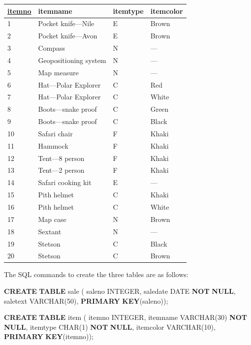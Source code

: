 \documentclass[
]{article}
\newenvironment{Shaded}{\begin{snugshade}}{\end{snugshade}}
\newcommand{\DataTypeTok}[1]{\textcolor[rgb]{0.13,0.29,0.53}{#1}}
\newcommand{\DecValTok}[1]{\textcolor[rgb]{0.00,0.00,0.81}{#1}}
\newcommand{\KeywordTok}[1]{\textcolor[rgb]{0.13,0.29,0.53}{\textbf{#1}}}
\newcommand{\NormalTok}[1]{#1}
\begin{document}
\begin{longtable}[]{@{}llll@{}}
\toprule
\underline{itemno} & itemname & itemtype & itemcolor \\
\midrule
\endhead
1 & Pocket knife---Nile & E & Brown \\
2 & Pocket knife---Avon & E & Brown \\
3 & Compass & N & --- \\
4 & Geopositioning system & N & --- \\
5 & Map measure & N & --- \\
6 & Hat---Polar Explorer & C & Red \\
7 & Hat---Polar Explorer & C & White \\
8 & Boots---snake proof & C & Green \\
9 & Boots---snake proof & C & Black \\
10 & Safari chair & F & Khaki \\
11 & Hammock & F & Khaki \\
12 & Tent---8 person & F & Khaki \\
13 & Tent---2 person & F & Khaki \\
14 & Safari cooking kit & E & --- \\
15 & Pith helmet & C & Khaki \\
16 & Pith helmet & C & White \\
17 & Map case & N & Brown \\
18 & Sextant & N & --- \\
19 & Stetson & C & Black \\
20 & Stetson & C & Brown \\
\bottomrule
\end{longtable}

The SQL commands to create the three tables are as follows:

\begin{Shaded}
\begin{Highlighting}[]
\KeywordTok{CREATE} \KeywordTok{TABLE}\NormalTok{ sale (}
\NormalTok{    saleno      }\DataTypeTok{INTEGER}\NormalTok{,}
\NormalTok{    saledate        }\DataTypeTok{DATE} \KeywordTok{NOT} \KeywordTok{NULL}\NormalTok{,}
\NormalTok{    saletext        }\DataTypeTok{VARCHAR}\NormalTok{(}\DecValTok{50}\NormalTok{),}
      \KeywordTok{PRIMARY} \KeywordTok{KEY}\NormalTok{(saleno));}
\end{Highlighting}
\end{Shaded}

\begin{Shaded}
\begin{Highlighting}[]
\KeywordTok{CREATE} \KeywordTok{TABLE}\NormalTok{ item (}
\NormalTok{    itemno      }\DataTypeTok{INTEGER}\NormalTok{,}
\NormalTok{    itemname        }\DataTypeTok{VARCHAR}\NormalTok{(}\DecValTok{30}\NormalTok{) }\KeywordTok{NOT} \KeywordTok{NULL}\NormalTok{,}
\NormalTok{    itemtype        }\DataTypeTok{CHAR}\NormalTok{(}\DecValTok{1}\NormalTok{) }\KeywordTok{NOT} \KeywordTok{NULL}\NormalTok{,}
\NormalTok{    itemcolor       }\DataTypeTok{VARCHAR}\NormalTok{(}\DecValTok{10}\NormalTok{),}
        \KeywordTok{PRIMARY} \KeywordTok{KEY}\NormalTok{(itemno));}
\end{Highlighting}
\end{Shaded}
\end{document}
